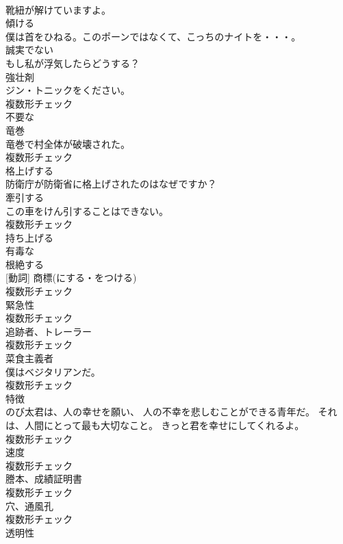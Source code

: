 \documentclass[8pt]{extreport}
\begin{document}
\begin{CJK}{UTF8}{min}
\\	靴紐が解けていますよ。	
\\	[動詞]	傾ける	
\\	僕は首をひねる。このポーンではなくて、こっちのナイトを・・・。	
\\	[形容詞]	誠実でない	
\\	もし私が浮気したらどうする？	
\\	[名詞]	強壮剤	
\\	ジン・トニックをください。	
\\	複数形チェック
\\	[形容詞]	不要な	
\\	[名詞]	⻯巻	
\\	竜巻で村全体が破壊された。	
\\	複数形チェック
\\	[動詞]	格上げする	
\\	防衛庁が防衛省に格上げされたのはなぜですか？	
\\	[名詞]	牽引する	
\\	この車をけん引することはできない。	
\\	複数形チェック
\\	[動詞]	持ち上げる	
\\	[形容詞]	有毒な	
\\	[動詞]	根絶する	
\\	[名詞] [動詞]	商標(にする・をつける)	
\\	複数形チェック
\\	[名詞]	緊急性	
\\	複数形チェック
\\	[名詞]	追跡者、トレーラー	
\\	複数形チェック
\\	[名詞]	菜食主義者	
\\	僕はベジタリアンだ。	
\\	複数形チェック
\\	[名詞]	特徴	
\\	のび太君は、人の幸せを願い、 人の不幸を悲しむことができる青年だ。 それは、人間にとって最も大切なこと。 きっと君を幸せにしてくれるよ。	
\\	複数形チェック
\\	[名詞]	速度	
\\	複数形チェック
\\	[名詞]	謄本、成績証明書	
\\	複数形チェック
\\	[名詞]	穴、通風孔	
\\	複数形チェック
\\	[名詞]	透明性	

\end{CJK}
\end{document}
